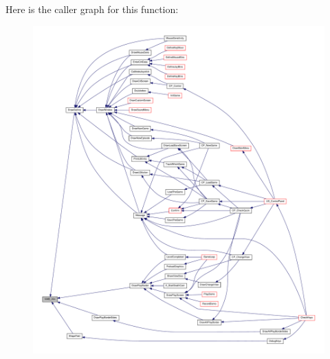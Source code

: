 Here is the caller graph for this function:
\nopagebreak
\begin{figure}[H]
\begin{center}
\leavevmode
\includegraphics[width=400pt]{ID__VH_8H_adad5945cddefd75d9c787644201b242f_icgraph}
\end{center}
\end{figure}




